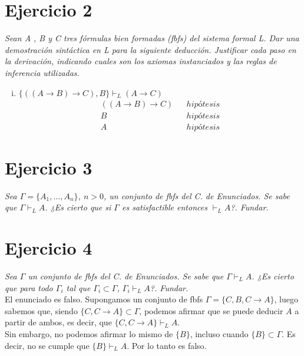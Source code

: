 \documentclass[osajnl,twocolumn,showpacs,superscriptaddress,10pt,leqno]{revtex4-1} %
\begin{document}
\section{Ejercicio 2}

\textit{Sean A , B y C tres fórmulas bien formadas (fbfs) del sistema formal L. Dar una demostración sintáctica en L para la siguiente deducción. Justificar cada paso en la derivación, indicando cuales son los axiomas instanciados y las reglas de inferencia utilizadas.}

\begin{enumerate}[i.]
    \item $\{((A \rightarrow B) \rightarrow C), B\} \vdash_L (A \rightarrow C)$ \\

    \begin{align}
        ((A \rightarrow B) \rightarrow C) && hipótesis \\
        B && hipótesis \\
        A && hipótesis
    \end{align}
\end{enumerate}

\section{Ejercicio 3}

\textit{Sea $\Gamma = \{A_1,\ldots, A_n\}$, $n > 0$, un conjunto de fbfs del C. de Enunciados. Se sabe que $\Gamma \vdash_L A$. ¿Es cierto que si $\Gamma$ es satisfactible entonces $\vdash_L A$?. Fundar.} \\

\section{Ejercicio 4}

\textit{Sea $\Gamma$ un conjunto de fbfs del C. de Enunciados. Se sabe que $\Gamma \vdash_L A$. ¿Es cierto que para todo $\Gamma_i$ tal que $\Gamma_i \subset \Gamma$, $\Gamma_i \vdash_L A$?. Fundar.} \\

El enunciado es falso. Supongamos un conjunto de fbfs $\Gamma = \{ C, B, C \rightarrow A \}$,
luego sabemos que, siendo $\{ C, C \rightarrow A \} \subset \Gamma$, podemos afirmar que se puede deducir
$A$ a partir de ambos, es decir, que $\{ C, C \rightarrow A \} \vdash_L A$. \\

Sin embargo, no podemos afirmar lo mismo de $\{ B \}$, incluso cuando $\{ B \} \subset \Gamma$. Es decir,
no se cumple que $\{ B \} \vdash_L A$. Por lo tanto es falso.
\end{document}
